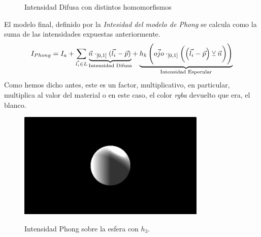 \begin{figure}[H]
  \centering
  \captionsetup{justification=centering}%
  \caption{Intensidad Difusa con distintos homomorfismos}
\end{figure}
El modelo final, definido por la \textit{Intesidad del modelo de Phong} se calcula como la suma de las intensidades expuestas anteriormente.
\[I_{Phong}=I_a+\sum_{\Vec{l_i}\in L} \mathrlap{\underbrace{\phantom{\Vec{n}\cdot_{[0, 1]}(\Vec{l_i}-\Vec{p})}}_{\text{Intensidad Difusa}}}\Vec{n}\cdot_{[0, 1]}(\Vec{l_i}-\Vec{p}) + \mathrlap{\underbrace{\phantom{h_k\left(\Vec{ojo}\cdot_{[0, 1]}\left(\left(\Vec{l_i}-\Vec{p}\right) \veebar \Vec{n}\right)\right)}}_{\text{Intensidad Especular}}}h_k\left(\Vec{ojo}\cdot_{[0, 1]}\left(\left(\Vec{l_i}-\Vec{p}\right) \veebar \Vec{n}\right)\right)\]
Como hemos dicho antes, este es un factor, multiplicativo, en particular, multiplica al valor del material o en este caso, el color \textit{rgba} devuelto que era, el blanco.
\begin{figure}[H]
  \centering
  \captionsetup{justification=centering}%
  \includegraphics[width=0.8\textwidth]{secciones/imagenes/lightmodel/phong.png}\label{fig:phong}
  \caption{Intensidad Phong sobre la esfera con \(h_3\).}
\end{figure}
